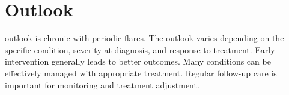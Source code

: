 \section{Outlook}
outlook is chronic with periodic flares. The outlook varies depending on the specific condition, severity at diagnosis, and response to treatment. Early intervention generally leads to better outcomes. Many conditions can be effectively managed with appropriate treatment. Regular follow-up care is important for monitoring and treatment adjustment.
